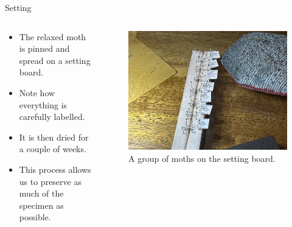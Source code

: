 \documentclass[
  ignorenonframetext,
]{beamer}
\providecommand{\tightlist}{%
  \setlength{\itemsep}{0pt}\setlength{\parskip}{0pt}}
\begin{document}
\begin{frame}{Setting}
\protect\hypertarget{setting}{}
\begin{columns}[T]
\begin{column}{0.5\textwidth}
\begin{itemize}
\tightlist
\item
  The relaxed moth is pinned and spread on a setting board.
\item
  Note how everything is carefully labelled.
\item
  It is then dried for a couple of weeks.
\item
  This process allows us to preserve as much of the specimen as
  possible.
\end{itemize}
\end{column}

\begin{column}{0.5\textwidth}
\begin{figure}
\centering
\includegraphics{./images/setting_moths.jpg}
\caption{A group of moths on the setting board.}
\end{figure}
\end{column}
\end{columns}
\end{frame}
\end{document}
